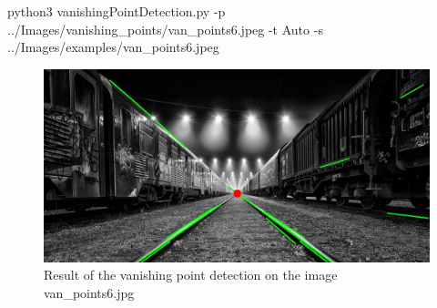 \begin{bashscript}
    python3 vanishingPointDetection.py -p ../Images/vanishing_points/van_points6.jpeg -t Auto -s ../Images/examples/van_points6.jpeg
\end{bashscript}

\begin{figure}[H]
    \centering
    \includegraphics[width=0.4\columnwidth]{../Images/examples/van_points6.jpg}
    \caption{Result of the vanishing point detection on the image van\_points6.jpg}
    \label{fig-9}
\end{figure}